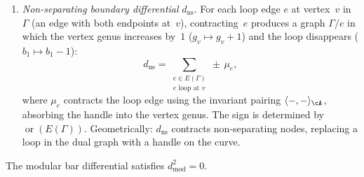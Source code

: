 \begin{definition}
\begin{enumerate}[label=\textup{(\roman*)}]
\item \emph{Non-separating boundary differential} $d_{\mathrm{ns}}$.
  For each loop edge $e$ at vertex~$v$ in~$\Gamma$
  (an edge with both endpoints at~$v$),
  contracting~$e$ produces a graph $\Gamma / e$ in which
  the vertex genus increases by~$1$ ($g_v \mapsto g_v + 1$)
  and the loop disappears ($b_1 \mapsto b_1 - 1$):
  \begin{equation}\label{eq:d-nonsep}
  d_{\mathrm{ns}} = \sum_{\substack{e \in E(\Gamma) \\
    e \text{ loop at } v}}
  \pm\, \mu_e,
  \end{equation}
  where $\mu_e$ contracts the loop edge using the invariant
  pairing $\langle -, - \rangle_\cA$, absorbing the handle
  into the vertex genus.  The sign is determined by
  $\operatorname{or}(E(\Gamma))$.
  Geometrically: $d_{\mathrm{ns}}$ contracts non-separating
  nodes, replacing a loop in the dual graph with a handle on
  the curve.
\end{enumerate}
\end{definition}

\begin{proposition}[$d_{\mathrm{mod}}^2 = 0$;
\ClaimStatusProvedHere]\label{prop:d-mod-squared-zero}
The modular bar differential satisfies $d_{\mathrm{mod}}^2 = 0$.
\end{proposition}

